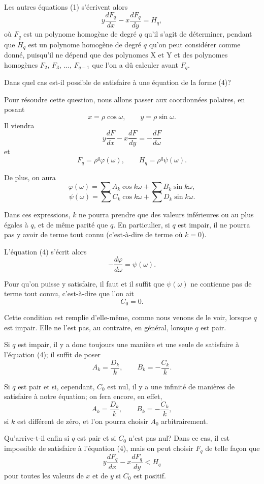 \documentclass[11pt]{article}
\begin{document}
Les autres équations (1) s’écrivent alors
\begin{equation}\tag{4}
y\frac{dF_q}{dx}-x\frac{dF_q}{dy}=H_q,
\end{equation}
où $F_q$ est un polynome homogène de degré $q$ qu’il s’agit de déterminer, pendant que $H_q$ est un polynome homogène de degré $q$ qu’on peut considérer comme donné, puisqu’il ne dépend que des polynomes X et Y et des polynomes homogènes $F_2$, $F_3$, $\ldots$, $F_{q-1}$ que l’on a dû calculer avant $F_q$.

Dans quel cas est-il possible de satisfaire à une équation de la forme (4)?

Pour résoudre cette question, nous allons passer aux coordonnées polaires, en posant
\[
x=\rho\cos\omega,
\qquad
y=\rho\sin\omega.
\]
Il viendra
\[
y\frac{dF}{dx}-x\frac{dF}{dy}=-\frac{dF}{d\omega}
\]
et
\[
F_q=\rho^q\varphi(\omega),
\qquad
H_q=\rho^q\psi(\omega).
\]

De plus, on aura
\[
\varphi(\omega)=\sum A_k\cos k\omega+\sum B_k\sin k\omega,
\]
\[
\psi(\omega)=\sum C_k\cos k\omega+\sum D_k\sin k\omega.
\]

Dans ces expressions, $k$ ne pourra prendre que des valeurs inférieures ou au plus égales à $q$, et de même parité que $q$. En particulier, si $q$ est impair, il ne pourra pas y avoir de terme tout connu (c’est-à-dire de terme où $k=0$).

L’équation (4) s’écrit alors
\[
-\frac{d\varphi}{d\omega}=\psi(\omega).
\]

Pour qu’on puisse y satisfaire, il faut et il suffit que $\psi(\omega)$ ne contienne pas de terme tout connu, c’est-à-dire que l’on ait
\[
C_0=0.
\]

Cette condition est remplie d’elle-même, comme nous venons de le voir, lorsque $q$ est impair. Elle ne l’est pas, au contraire, en général, lorsque $q$ est pair.

Si $q$ est impair, il y a donc toujours une manière et une seule de satisfaire à l’équation (4); il suffit de poser
\[
A_k=\frac{D_k}{k},
\qquad
B_k=-\frac{C_k}{k}.
\]

Si $q$ est pair et si, cependant, $C_0$ est nul, il y a une infinité de manières de satisfaire à notre équation; on fera encore, en effet,
\[
A_k=\frac{D_k}{k},
\qquad
B_k=-\frac{C_k}{k},
\]
si $k$ est différent de zéro, et l’on pourra choisir $A_0$ arbitrairement.

Qu’arrive-t-il enfin si $q$ est pair et si $C_0$ n’est pas nul? Dans ce cas, il est impossible de satisfaire à l’équation (4), mais on peut choisir $F_q$ de telle façon que
\[
y\frac{dF_q}{dx}-x\frac{dF_q}{dy}<H_q
\]
pour toutes les valeurs de $x$ et de $y$ si $C_0$ est positif.
\end{document}
